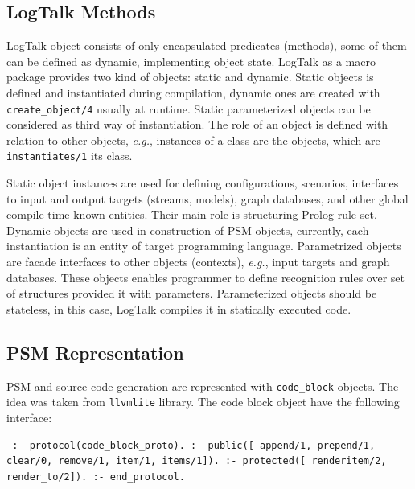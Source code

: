 \documentclass[conference]{IEEEtran} \IEEEoverridecommandlockouts
\begin{document}
\subsection{LogTalk Methods} \label{sec:lgt-methods} 

LogTalk object consists of only encapsulated predicates (methods), some of them can be defined as dynamic, implementing object state. LogTalk as a macro package provides two kind of objects: static and dynamic. Static objects is defined and instantiated during compilation, dynamic ones are created with \texttt{create\_object/4} usually at runtime. Static parameterized objects can be considered as third way of instantiation. The role of an object is defined with relation to other objects, \emph{e.g.}, instances of a class are the objects, which are \verb|instantiates/1| its class. 

Static object instances are used for defining configurations, scenarios, interfaces to input and output targets (streams, models), graph databases, and other global compile time known entities. Their main role is structuring Prolog rule set. Dynamic objects are used in construction of PSM objects, currently, each instantiation is an entity of target programming language. Parametrized objects are facade interfaces to other objects (contexts), \emph{e.g.}, input targets and graph databases. These objects enables programmer to define recognition rules over set of structures provided it with parameters. Parameterized objects should be stateless, in this case, LogTalk compiles it in statically executed code. 

\subsection{PSM Representation} \label{sec:blocks} 

PSM and source code generation are represented with \texttt{code\_block} objects. The idea was taken from \verb|llvmlite| library. The code block object have the following interface: \begin{verbatim} :- protocol(code_block_proto). :- public([ append/1, prepend/1, clear/0, remove/1, item/1, items/1]). :- protected([ renderitem/2, render_to/2]). :- end_protocol. \end{verbatim} 
\end{document}
